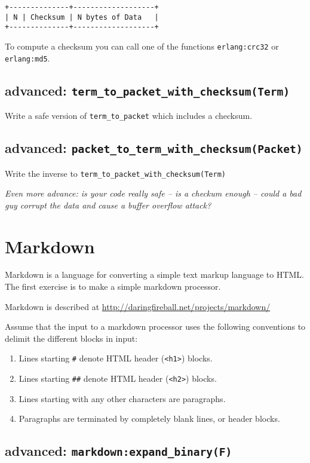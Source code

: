 \documentclass[12pt]{hitec}
\begin{document}
\begin{verbatim}
+--------------+-------------------+
| N | Checksum | N bytes of Data   |
+--------------+-------------------+
\end{verbatim}

To compute a checksum you can call one of the functions
\verb+erlang:crc32+ or \verb+erlang:md5+.


\subsection{advanced: \texttt{term\_to\_packet\_with\_checksum(Term)}}
Write a safe version of \verb+term_to_packet+ which includes a checksum.

\subsection{advanced: \texttt{packet\_to\_term\_with\_checksum(Packet)}}
Write the inverse to \verb+term_to_packet_with_checksum(Term)+

{\sl Even more advance: is your code really safe -- is a checkum
  enough -- could a bad guy corrupt the data and cause a buffer
  overflow attack?}

\section{Markdown}

Markdown is a language for converting a simple text markup language
to HTML. The first exercise is to make a simple markdown processor.

Markdown is described at
\url{http://daringfireball.net/projects/markdown/}

Assume that the input to a markdown processor uses the following
conventions to delimit the different blocks in input:

\begin{enumerate}
\item Lines starting \verb+#+ denote HTML header (\verb+<h1>+) blocks.
\item Lines starting \verb+##+ denote HTML header (\verb+<h2>+) blocks.
\item Lines starting with any other characters are paragraphs.
\item Paragraphs are terminated by completely blank lines, or header blocks.
\end{enumerate}

\subsection{advanced: \texttt{markdown:expand\_binary(F)}}
\end{document}
